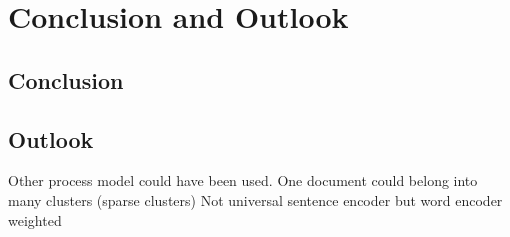 \chapter{Conclusion and Outlook}
\section{Conclusion}
\section{Outlook}
Other process model could have been used.
One document could belong into many clusters (sparse clusters)
Not universal sentence encoder but word encoder weighted